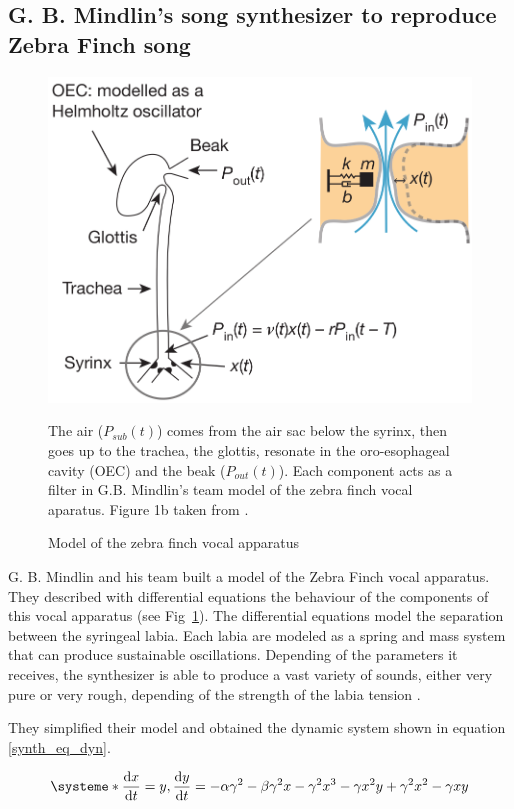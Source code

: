 \documentclass{report}
\begin{document}
\subsection{G. B. Mindlin's song synthesizer to reproduce Zebra Finch song}
\label{description-of-perl-song-synthesizer-to-reproduce-zebra-finch-song}

\begin{figure}[htbp]
  {\center
  \includegraphics[width=0.5\linewidth]{media/scheme_vocal_apparatus}
  \caption{Model of the zebra finch vocal apparatus\label{zf-vocal-aparatus}}}
  \small

  The air (\(P_{sub}(t)\)) comes from the air sac below the syrinx, then goes up
  to the trachea, the glottis, resonate in the oro-esophageal cavity (OEC) and
  the beak (\(P_{out}(t)\)). Each component acts as a filter in G.B. Mindlin's
  team model of the zebra finch vocal aparatus. Figure 1b taken from
  \textcite{amador_elemental_2013}.

\end{figure}

G. B. Mindlin and his team built a model of the Zebra Finch vocal apparatus.
They described with differential equations the behaviour of the components of
this vocal apparatus (see Fig~\ref{zf-vocal-aparatus}). The differential
equations model the separation between the syringeal labia. Each labia are
modeled as a spring and mass system that can produce sustainable oscillations.
Depending of the parameters it receives, the synthesizer is able to produce a
vast variety of sounds, either very pure or very rough, depending of the
strength of the labia tension \parencite{amador_beyond_2008,
boari_automatic_2015}.

They simplified their model and obtained the dynamic system shown in equation \ref{synth_eq_dyn}.

\begin{equation}
\systeme*{
\dv{x}{t} = y,
\dv{y}{t} = - \alpha \gamma^2 - \beta \gamma^2 x - \gamma^2 x^3 - \gamma x^2 y
    + \gamma^2 x^2 - \gamma x y
}
\label{synth_eq_dyn}
\end{equation}
\end{document}
